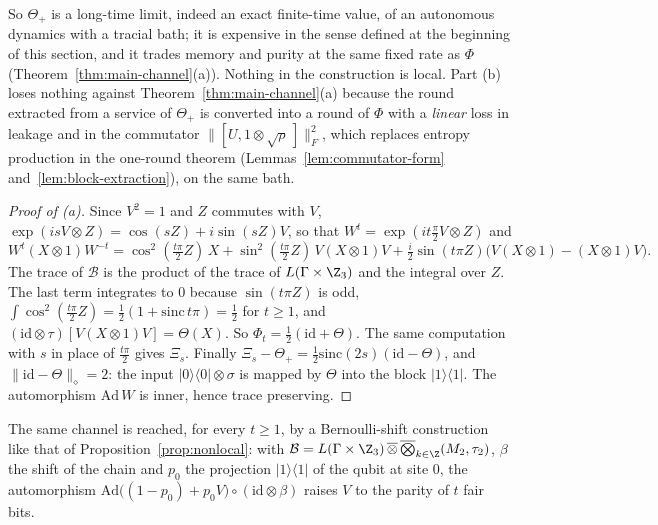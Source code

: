 So $\Theta_+$ is a long-time limit, indeed an exact finite-time value, of an autonomous dynamics with a tracial bath; it is expensive in the
sense defined at the beginning of this section, and it trades memory and purity at the same fixed rate as $\Phi$ (Theorem~\ref{thm:main-channel}(a)). Nothing in the construction is local. Part (b) loses nothing against
Theorem~\ref{thm:main-channel}(a) because the round extracted from a service of $\Theta_+$ is converted into a round of $\Phi$ with a
\emph{linear} loss in leakage and in the commutator $\|[U,1\otimes\sqrt\rho\,]\|_F^2$, which replaces entropy production in the one-round theorem
(Lemmas~\ref{lem:commutator-form} and~\ref{lem:block-extraction}), on the same bath.

\begin{proof}[Proof of (a)]
Since $V^2=1$ and $Z$ commutes with $V$, $\exp(isV\otimes Z)=\cos(sZ)+i\sin(sZ)V$, so that $W^t=\exp(it\frac\pi2V\otimes Z)$ and
\[
W^t(X\otimes1)W^{-t}=\cos^2(\tfrac{t\pi}2Z)\,X+\sin^2(\tfrac{t\pi}2Z)\,V(X\otimes1)V+\tfrac i2\sin(t\pi Z)\bigl(V(X\otimes1)-(X\otimes1)V\bigr).
\]
The trace of $\mathcal B$ is the product of the trace of $L(\Gamma\times\Z_3)$ and the integral over $Z$. The last term integrates to $0$ because
$\sin(t\pi Z)$ is odd, $\int\cos^2(\frac{t\pi}2Z)=\frac12(1+\mathrm{sinc}\,t\pi)=\frac12$ for $t\ge1$, and $(\mathrm{id}\otimes\tau)[V(X\otimes1)V]=\Theta(X)$.
So $\Phi_t=\frac12(\mathrm{id}+\Theta)$. The same computation with $s$ in place of $\frac{t\pi}2$ gives $\Xi_s$. Finally
$\Xi_s-\Theta_+=\frac12\mathrm{sinc}(2s)(\mathrm{id}-\Theta)$, and $\|\mathrm{id}-\Theta\|_\diamond=2$: the input $|0\rangle\langle0|\otimes\sigma$ is mapped
by $\Theta$ into the block $|1\rangle\langle1|$. The automorphism $\mathrm{Ad}\,W$ is inner, hence trace preserving.
\end{proof}

The same channel is reached, for every $t\ge1$, by a Bernoulli-shift construction like that of Proposition~\ref{prop:nonlocal}: with
$\mathcal B=L(\Gamma\times\Z_3)\,\overline\otimes\,\overline\bigotimes_{k\in\Z}(M_2,\tau_2)$, $\beta$ the shift of the chain and $p_0$ the projection $|1\rangle\langle1|$ of the qubit at site $0$, the automorphism
$\mathrm{Ad}\bigl((1-p_0)+p_0V\bigr)\circ(\mathrm{id}\otimes\beta)$ raises $V$ to the parity of $t$ fair bits.

